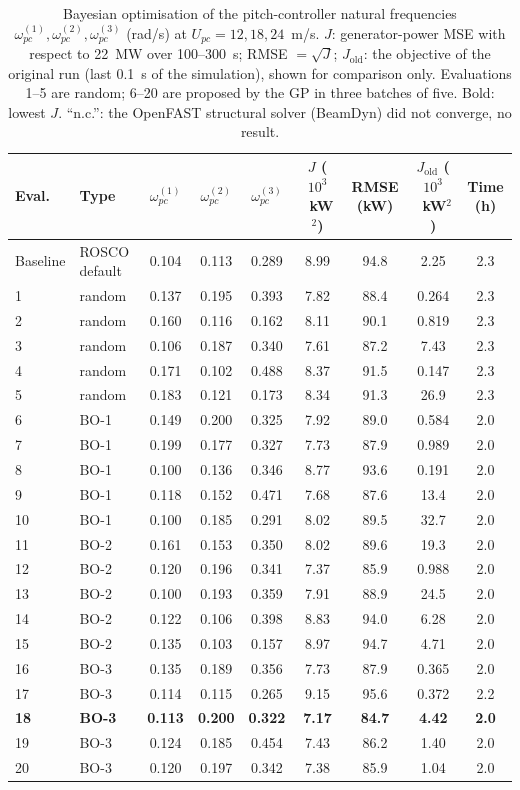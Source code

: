 \begin{table}[h]
\centering\small
\caption{Bayesian optimisation of the pitch-controller natural frequencies $\omega_{pc}^{(1)},\omega_{pc}^{(2)},\omega_{pc}^{(3)}$ (rad/s) at $U_{pc}=12,18,24$~m/s. $J$: generator-power MSE with respect to 22~MW over 100--300~s; RMSE $=\sqrt{J}$; $J_{\text{old}}$: the objective of the original run (last 0.1~s of the simulation), shown for comparison only. Evaluations 1--5 are random; 6--20 are proposed by the GP in three batches of five. Bold: lowest $J$. ``n.c.'': the OpenFAST structural solver (BeamDyn) did not converge, no result.}
\label{tab:optimized_parameters}
\begin{tabular}{llccccccc}
\hline
Eval. & Type & $\omega_{pc}^{(1)}$ & $\omega_{pc}^{(2)}$ & $\omega_{pc}^{(3)}$ & $J$ ($10^3$~kW$^2$) & RMSE (kW) & $J_{\text{old}}$ ($10^3$~kW$^2$) & Time (h) \\
\hline
Baseline & ROSCO default & 0.104 & 0.113 & 0.289 & 8.99 & 94.8 & 2.25 & 2.3 \\
\hline
1 & random & 0.137 & 0.195 & 0.393 & 7.82 & 88.4 & 0.264 & 2.3 \\
2 & random & 0.160 & 0.116 & 0.162 & 8.11 & 90.1 & 0.819 & 2.3 \\
3 & random & 0.106 & 0.187 & 0.340 & 7.61 & 87.2 & 7.43 & 2.3 \\
4 & random & 0.171 & 0.102 & 0.488 & 8.37 & 91.5 & 0.147 & 2.3 \\
5 & random & 0.183 & 0.121 & 0.173 & 8.34 & 91.3 & 26.9 & 2.3 \\
6 & BO-1 & 0.149 & 0.200 & 0.325 & 7.92 & 89.0 & 0.584 & 2.0 \\
7 & BO-1 & 0.199 & 0.177 & 0.327 & 7.73 & 87.9 & 0.989 & 2.0 \\
8 & BO-1 & 0.100 & 0.136 & 0.346 & 8.77 & 93.6 & 0.191 & 2.0 \\
9 & BO-1 & 0.118 & 0.152 & 0.471 & 7.68 & 87.6 & 13.4 & 2.0 \\
10 & BO-1 & 0.100 & 0.185 & 0.291 & 8.02 & 89.5 & 32.7 & 2.0 \\
11 & BO-2 & 0.161 & 0.153 & 0.350 & 8.02 & 89.6 & 19.3 & 2.0 \\
12 & BO-2 & 0.120 & 0.196 & 0.341 & 7.37 & 85.9 & 0.988 & 2.0 \\
13 & BO-2 & 0.100 & 0.193 & 0.359 & 7.91 & 88.9 & 24.5 & 2.0 \\
14 & BO-2 & 0.122 & 0.106 & 0.398 & 8.83 & 94.0 & 6.28 & 2.0 \\
15 & BO-2 & 0.135 & 0.103 & 0.157 & 8.97 & 94.7 & 4.71 & 2.0 \\
16 & BO-3 & 0.135 & 0.189 & 0.356 & 7.73 & 87.9 & 0.365 & 2.0 \\
17 & BO-3 & 0.114 & 0.115 & 0.265 & 9.15 & 95.6 & 0.372 & 2.2 \\
\textbf{18} & \textbf{BO-3} & \textbf{0.113} & \textbf{0.200} & \textbf{0.322} & \textbf{7.17} & \textbf{84.7} & \textbf{4.42} & \textbf{2.0} \\
19 & BO-3 & 0.124 & 0.185 & 0.454 & 7.43 & 86.2 & 1.40 & 2.0 \\
20 & BO-3 & 0.120 & 0.197 & 0.342 & 7.38 & 85.9 & 1.04 & 2.0 \\
\hline
\end{tabular}
\end{table}
